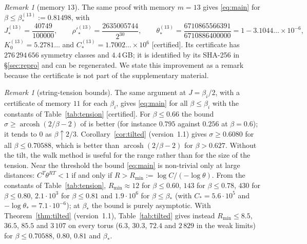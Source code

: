 \documentclass[11pt,a4paper]{article}
\theoremstyle{plain}
\theoremstyle{remark}
\newtheorem{remark}[theorem]{Remark}
\numberwithin{equation}{section}
\newcommand{\st}[1]{\textsf{[#1]}}
\begin{document}
\begin{remark}[memory $13$]\label{rem:m13}
The same proof with memory $m=13$ gives \eqref{eq:main} for $\beta\le\beta_*^{(13)}:=0.81498$, with
\[
J_*^{(13)}=\frac{40749}{100000},\qquad \rho'^{(13)}_*=\frac{2635005744}{2^{30}},\qquad
\theta_*^{(13)}=\frac{6710865566391}{6710886400000}=1-3.1044\ldots\times10^{-6},
\]
$K_0^{(13)}=5.2781\ldots$ and $C_*^{(13)}=1.7002\ldots\times10^{6}$ \st{certified}. Its certificate has $276\,294\,656$ symmetry
classes and $4.4$\,GB; it is identified by its SHA-256 in \S\ref{sec:repro} and can be regenerated. We state this improvement as a
remark because the certificate is not part of the supplementary material.
\end{remark}

\begin{remark}[string-tension bounds]\label{rem:table}
The same argument at $J=\beta_i/2$, with a certificate of memory $11$ for each $\beta_i$, gives \eqref{eq:main} for all
$\beta\le\beta_i$ with the constants of Table~\ref{tab:tension} \st{certified}. For $\beta\le0.66$ the bound
$\sigma\ge\operatorname{arcosh}(2/\beta-2)$ of \cite[Cor.~7.2]{D7} is better (for instance $0.795$ against $0.256$ at $\beta=0.6$); it
tends to $0$ as $\beta\uparrow2/3$. Corollary~\ref{cor:tilted} (version~1.1) gives $\sigma\ge0.6080$ for all $\beta\le0.70588$, which is better than
$\operatorname{arcosh}(2/\beta-2)$ for $\beta>0.627$. Without the tilt, the walk method is useful for the range rather than for the size of
the tension.
Near the threshold the bound \eqref{eq:main} is non-trivial only at large distances: $C^T\theta^{RT}<1$ if and only if
$R>R_{\min}:=\log C/(-\log\theta)$. From the constants of Table~\ref{tab:tension}, $R_{\min}\approx12$ for $\beta\le0.60$,
$143$ for $\beta\le0.78$, $430$ for $\beta\le0.80$, $2.1\cdot10^{3}$ for $\beta\le0.81$ and $1.9\cdot10^{6}$ for $\beta\le\beta_*$
(with $C_*=5.6\cdot10^5$ and $-\log\theta_*=7.1\cdot10^{-6}$); at $\beta_*$ the bound is purely asymptotic. With Theorem~\ref{thm:tilted} (version~1.1), Table~\ref{tab:tilted} gives instead
$R_{\min}\le8.5$, $36.5$, $85.5$ and $3\,107$ on every torus ($6.3$, $30.3$, $72.4$ and $2\,829$ in the weak limits) for $\beta\le0.70588$,
$0.80$, $0.81$ and $\beta_*$.
\end{remark}
\end{document}
